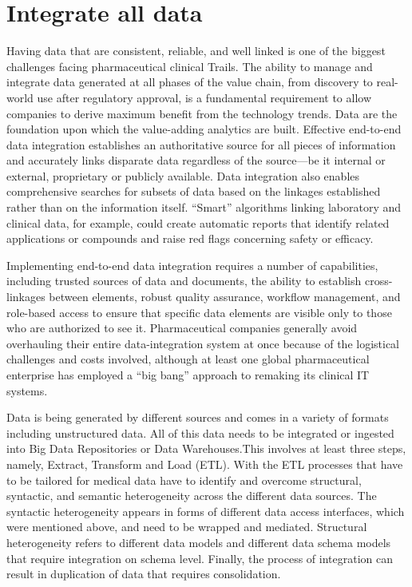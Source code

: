 \documentclass[sigconf]{acmart}
\begin{document}
\section{Integrate all data}

Having data that are consistent, reliable, and well linked is one of the biggest challenges facing pharmaceutical clinical Trails. The ability to manage and integrate data generated at all phases of the value chain, from discovery to real-world use after regulatory approval, is a fundamental requirement to allow companies to derive maximum benefit from the technology trends. Data are the foundation upon which the value-adding analytics are built. Effective end-to-end data integration establishes an authoritative source for all pieces of information and accurately links disparate data regardless of the source—be it internal or external, proprietary or publicly available. Data integration also enables comprehensive searches for subsets of data based on the linkages established rather than on the information itself. “Smart” algorithms linking laboratory and clinical data, for example, could create automatic reports that identify related applications or compounds and raise red flags concerning safety or efficacy.

Implementing end-to-end data integration requires a number of capabilities, including trusted sources of data and documents, the ability to establish cross-linkages between elements, robust quality assurance, workflow management, and role-based access to ensure that specific data elements are visible only to those who are authorized to see it. Pharmaceutical companies generally avoid overhauling their entire data-integration system at once because of the logistical challenges and costs involved, although at least one global pharmaceutical enterprise has employed a “big bang” approach to remaking its clinical IT systems.

Data is being generated by different sources and comes in a variety of formats including unstructured data. All of this data needs to be integrated or ingested into Big Data Repositories or Data Warehouses.This involves at least three steps, namely, Extract, Transform and Load (ETL). With the ETL processes that have to be tailored for medical data have to identify and overcome structural, syntactic, and semantic heterogeneity across the different data sources. The syntactic heterogeneity appears in forms of different data access interfaces, which were mentioned above, and need to be wrapped and
mediated. Structural heterogeneity refers to different data models and different data schema models that require integration on schema level. Finally, the process of integration can result in duplication of data that requires consolidation.
\end{document}
